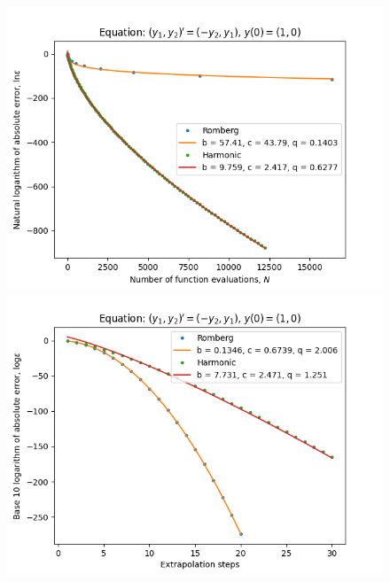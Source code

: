 \begin{figure}[H]
\centering
\begin{minipage}{0.45\textwidth}
\centering
\includegraphics[scale=0.45]{emr_plots/rotation_hp_trend.png}
\end{minipage}
\begin{minipage}{0.45\textwidth}
\centering
\includegraphics[scale=0.45]{emr_plots/rotation_hp_steps.png}
\end{minipage}
\end{figure}

